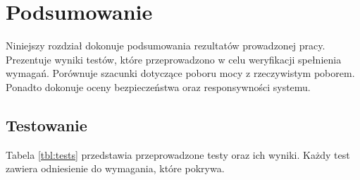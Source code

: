 \chapter{Podsumowanie}
\label{chap:results}

	Niniejszy rozdział dokonuje podsumowania rezultatów prowadzonej pracy. Prezentuje wyniki testów, które przeprowadzono w celu weryfikacji spełnienia wymagań. Porównuje szacunki dotyczące poboru mocy z rzeczywistym poborem. Ponadto dokonuje oceny bezpieczeństwa oraz responsywności systemu.

    \section{Testowanie}

        Tabela \ref{tbl:tests} przedstawia przeprowadzone testy oraz ich wyniki. Każdy test zawiera odniesienie do wymagania, które pokrywa.

